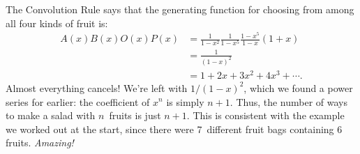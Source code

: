 The Convolution Rule says that the generating function for choosing
from among all four kinds of fruit is:
%
\begin{align*}
A(x) B(x) O(x) P(x)
    & = \frac{1}{1-x^2} \frac{1}{1-x^5} \frac{1-x^5}{1-x} (1 + x) \\
    & = \frac{1}{(1-x)^2} \\
    & = 1 + 2x + 3x^2 + 4 x^3 + \cdots.
\end{align*}
%
Almost everything cancels!  We're left with $1 / (1-x)^2$, which we
found a power series for earlier: the coefficient of $x^n$ is simply
$n+1$.  Thus, the number of ways to make a salad with $n$~fruits is
just $n+1$.  This is consistent with the example we worked out at the
start, since there were 7~different fruit bags containing 6 fruits.
\emph{Amazing!}
\begin{problems}
\practiceproblems
{}

\homeworkproblems
{}



\examproblems
{}

\end{problems}

\endinput
